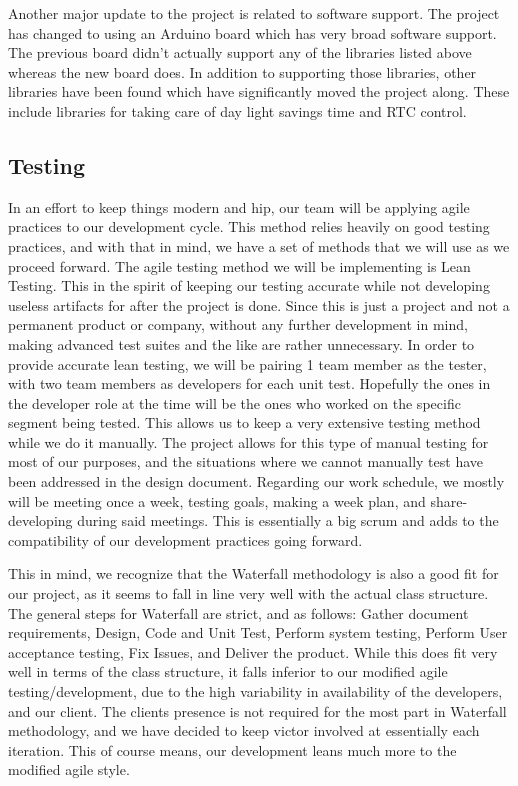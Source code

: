 \documentclass[onecolumn, draftclsnofoot,10pt, compsoc]{IEEEtran}
\begin{document}
Another major update to the project is related to software support.
The project has changed to using an Arduino board which has very broad software support.
The previous board didn't actually support any of the libraries listed above whereas the new board does.
In addition to supporting those libraries, other libraries have been found which have significantly moved the project along.
These include libraries for taking care of day light savings time and RTC control.

\subsection{Testing}
In an effort to keep things modern and hip, our team will be applying agile practices to our development cycle.
This method relies heavily on good testing practices, and with that in mind, we have a set of methods that we will use as we proceed forward.
The agile testing method we will be implementing is Lean Testing.
This in the spirit of keeping our testing accurate while not developing useless artifacts for after the project is done.
Since this is just a project and not a permanent product or company, without any further development in mind, making advanced test suites and the like are rather unnecessary.
In order to provide accurate lean testing, we will be pairing 1 team member as the tester, with two team members as developers for each unit test.
Hopefully the ones in the developer role at the time will be the ones who worked on the specific segment being tested.
This allows us to keep a very extensive testing method while we do it manually.
The project allows for this type of manual testing for most of our purposes, and the situations where we cannot manually test have been addressed in the design document.
Regarding our work schedule, we mostly will be meeting once a week, testing goals, making a week plan, and share-developing during said meetings.
This is essentially a big scrum and adds to the compatibility of our development practices going forward.

This in mind, we recognize that the Waterfall methodology is also a good fit for our project, as it seems to fall in line very well with the actual class structure.
The general steps for Waterfall are strict, and as follows: Gather document requirements, Design, Code and Unit Test, Perform system testing, Perform User acceptance testing, Fix Issues, and Deliver the product.
While this does fit very well in terms of the class structure, it falls inferior to our modified agile testing/development, due to the high variability in availability of the developers, and our client.
The clients presence is not required for the most part in Waterfall methodology, and we have decided to keep victor involved at essentially each iteration.
This of course means, our development leans much more to the modified agile style.
\end{document}
